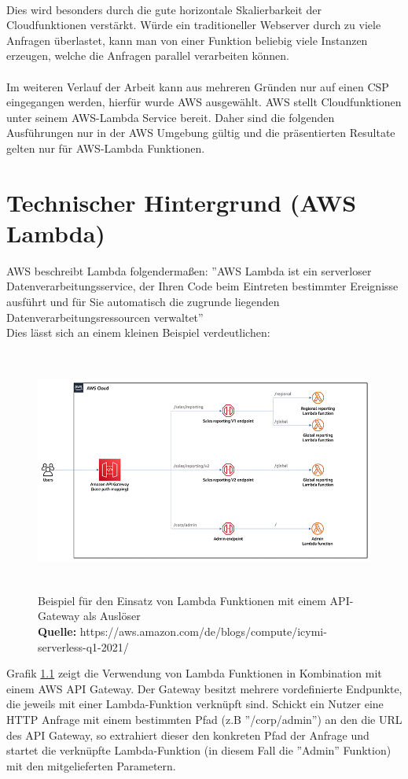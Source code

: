 \documentclass[12pt,a4paper,parskip=half]{scrreprt}
\newcommand*{\captionsource}[2]{%
	\caption[{#1}]{%
		#1%
		\\\hspace{\linewidth}%
		\textbf{Quelle:} #2%
	}%
}
\begin{document}
\\
Dies wird besonders durch die gute horizontale Skalierbarkeit der Cloudfunktionen verstärkt. Würde ein traditioneller Webserver durch zu viele Anfragen überlastet, kann man von einer Funktion beliebig viele Instanzen erzeugen, welche die Anfragen parallel verarbeiten können.
\\
\\
Im weiteren Verlauf der Arbeit kann aus mehreren Gründen nur auf einen CSP eingegangen werden, hierfür wurde AWS ausgewählt. AWS stellt Cloudfunktionen unter seinem AWS-Lambda Service bereit. Daher sind die folgenden Ausführungen nur in der AWS Umgebung gültig und die präsentierten Resultate gelten nur für AWS-Lambda Funktionen.

\chapter{Technischer Hintergrund (AWS Lambda)}
AWS beschreibt Lambda folgendermaßen: ''AWS Lambda ist ein serverloser Datenverarbeitungsservice, der Ihren Code beim Eintreten bestimmter Ereignisse ausführt und für Sie automatisch die zugrunde liegenden Datenverarbeitungsressourcen verwaltet'' \cite{Lambda-overview}
\\
Dies lässt sich an einem kleinen Beispiel verdeutlichen:
\FloatBarrier
\begin{figure}[h!]
	\centering
	\includegraphics[width=14cm, height=8cm]{LambdaExample}
	\captionsource{Beispiel für den Einsatz von Lambda Funktionen mit einem API-Gateway als Auslöser}
		{https://aws.amazon.com/de/blogs/compute/icymi-serverless-q1-2021/}
	\label{AWS_Example}
\end{figure}

Grafik \ref{AWS_Example} zeigt die Verwendung von Lambda Funktionen in Kombination mit einem AWS API Gateway. Der Gateway besitzt mehrere vordefinierte Endpunkte, die jeweils mit einer Lambda-Funktion verknüpft sind. Schickt ein Nutzer eine HTTP Anfrage mit einem bestimmten Pfad (z.B ''/corp/admin'') an den die URL des API Gateway, so extrahiert dieser den konkreten Pfad der Anfrage und startet die verknüpfte Lambda-Funktion (in diesem Fall die ''Admin'' Funktion) mit den mitgelieferten Parametern.
\end{document}
